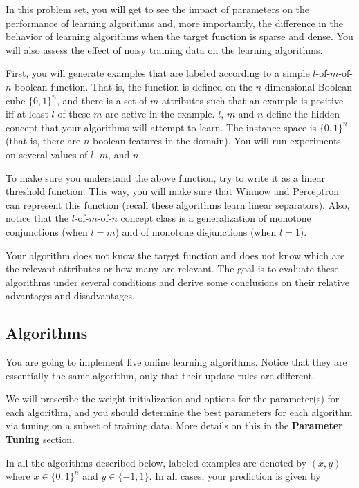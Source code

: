 In this problem set, you will get to see the impact of parameters on
the performance of learning algorithms and, more importantly, the
difference in the behavior of learning algorithms when the target
function is sparse and dense. You will also assess the effect of noisy
training data on the learning algorithms.

First, you will generate examples that are labeled according to a
simple $l$-of-$m$-of-$n$ boolean function. That is, the function is
defined on the $n$-dimensional Boolean cube $\{0,1\}^n$, and there is
a set of $m$ attributes such that an example is positive iff at least
$l$ of these $m$ are active in the example. $l$, $m$ and $n$ define the
hidden concept that your algorithms will attempt to learn.  The
instance space is $\{0,1\}^n$ (that is, there are $n$ boolean features
in the domain).  You will run experiments on several values of $l$,
$m$, and $n$.

To make sure you understand the above function, try to write it as a
linear threshold function. This way, you will make sure that Winnow
and Perceptron can represent this function (recall these algorithms
learn linear separators). Also, notice that the $l$-of-$m$-of-$n$ concept
class is a generalization of monotone conjunctions (when $l=m$) and of monotone
disjunctions (when $l=1$).

Your algorithm does not know the target function and does not know
which are the relevant attributes or how many are relevant.  The goal
is to evaluate these algorithms under several conditions and derive
some conclusions on their relative advantages and disadvantages.

\subsection*{Algorithms}

You are going to implement five online learning algorithms.  Notice that
they are essentially the same algorithm, only that their update rules are
different.

We will prescribe the weight initialization and options for the parameter(s) for each algorithm, and you should determine the best parameters for each algorithm via tuning on a subset of training data. More details on this in the {\bf Parameter Tuning} section.

In all the algorithms described below, labeled examples are denoted by $(x,y)$ where $x \in \{0,1\}^n$ and $y \in \{-1,1\}$. In all cases, your prediction is given by

